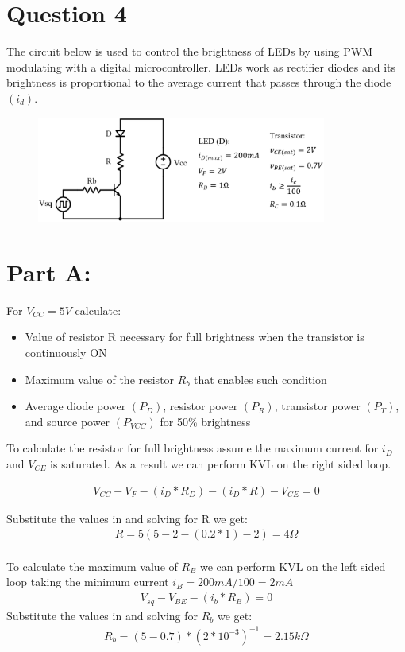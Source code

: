 \documentclass{article}
\begin{document}
\section{Question 4}
The circuit below is used to control the brightness of LEDs by using PWM modulating with a digital microcontroller. LEDs work as rectifier diodes and its brightness is proportional to the average current that passes through the diode $(i_d)$.
\begin{figure}[h]
    \centering
    \includegraphics[width=0.85\textwidth]{q4-circuit}
    \label{q4 circuit}
\end{figure}

\section*{Part A:}
For $V_{CC} = 5V$ calculate:
\begin{itemize}
    \item Value of resistor R necessary for full brightness when the transistor is continuously ON
    \item Maximum value of the resistor $R_b$ that enables such condition
    \item Average diode power $(P_D)$, resistor power $(P_R)$, transistor power $(P_T)$, and source power $(P_{VCC})$ for 50\% brightness
\end{itemize}

To calculate the resistor for full brightness assume the maximum current for $i_D$ and $V_{CE}$ is saturated. As a result we can perform KVL on the right sided loop.

\begin{align*}
    V_{CC} - V_F - (i_D*R_D) - (i_D * R) - V_{CE} = 0
\end{align*}

Substitute the values in and solving for R we get:
\begin{align}
    R = 5 (5-2-(0.2*1)-2) = 4\Omega
\end{align}
\\ To calculate the maximum value of $R_B$ we can perform KVL on the left sided loop taking the minimum current $i_B = 200mA / 100 = 2mA$
\begin{align*}
    V_{sq} - V_{BE} - (i_b * R_B) = 0
\end{align*}
Substitute the values in and solving for $R_b$ we get:
\begin{align}
    R_b = (5 - 0.7)*(2*10^{-3})^{-1} = 2.15 k\Omega
\end{align}
\end{document}

